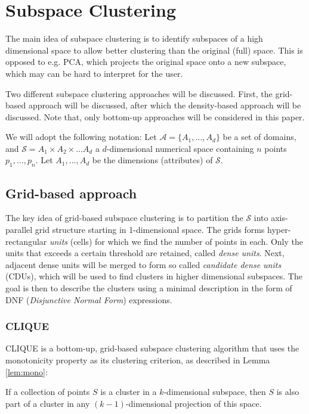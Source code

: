 \section{Subspace Clustering}
The main idea of subspace clustering is to identify subspaces of a high dimensional space to allow better clustering than the original (full) space. This is opposed to e.g. PCA, which projects the original space onto a new subspace, which may can be hard to interpret for the user.

Two different subspace clustering approaches will be discussed. First, the grid-based approach will be discussed, after which the density-based approach will be discussed. Note that, only bottom-up approaches will be considered in this paper.

We will adopt the following notation: Let $\mathcal{A} = \{A_1, \dots, A_d\}$ be a set of domains, and $\mathcal{S} = A_1 \times A_2 \times \dots A_d$ a $d$-dimensional numerical space containing $n$ points $p_1, \dots, p_n$. Let $A_1, \dots, A_d$ be the dimensions (attributes) of $\mathcal{S}$.

\subsection{Grid-based approach}
The key idea of grid-based subspace clustering is to partition the $\mathcal{S}$ into axis-parallel grid structure starting in 1-dimensional space. The grids forms hyper-rectangular \textit{units} (cells) for which we find the number of points in each. Only the units that exceeds a certain threshold are retained, called \textit{dense units}. Next, adjacent dense units will be merged to form so called \textit{candidate dense units} (CDUs), which will be used to find clusters in higher dimensional subspaces. The goal is then to describe the clusters using a minimal description in the form of DNF (\textit{Disjunctive Normal Form}) expressions.

\subsubsection{CLIQUE}
CLIQUE is a bottom-up, grid-based subspace clustering algorithm that uses the monotonicity property as its clustering criterion, as described in Lemma \ref{lem:mono}:

\begin{lemma}\label{lem:mono}
    If a collection of points $S$ is a cluster in a $k$-dimensional subspace, then $S$ is also part of a cluster in any $(k-1)$-dimensional projection of this space.
\end{lemma}

